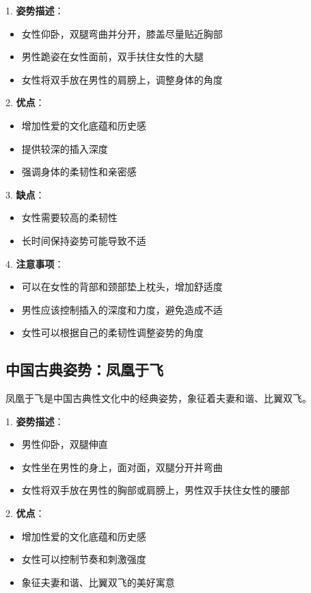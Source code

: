 \documentclass[12pt,UTF8]{ctexbook}
\begin{document}
1. \textbf{姿势描述}：
  \begin{itemize}
  \item 女性仰卧，双腿弯曲并分开，膝盖尽量贴近胸部
  \item 男性跪姿在女性面前，双手扶住女性的大腿
  \item 女性将双手放在男性的肩膀上，调整身体的角度
  \end{itemize}

2. \textbf{优点}：
  \begin{itemize}
  \item 增加性爱的文化底蕴和历史感
  \item 提供较深的插入深度
  \item 强调身体的柔韧性和亲密感
  \end{itemize}

3. \textbf{缺点}：
  \begin{itemize}
  \item 女性需要较高的柔韧性
  \item 长时间保持姿势可能导致不适
  \end{itemize}

4. \textbf{注意事项}：
  \begin{itemize}
  \item 可以在女性的背部和颈部垫上枕头，增加舒适度
  \item 男性应该控制插入的深度和力度，避免造成不适
  \item 女性可以根据自己的柔韧性调整姿势的角度
  \end{itemize}

\subsection{中国古典姿势：凤凰于飞}

凤凰于飞是中国古典性文化中的经典姿势，象征着夫妻和谐、比翼双飞。

1. \textbf{姿势描述}：
  \begin{itemize}
  \item 男性仰卧，双腿伸直
  \item 女性坐在男性的身上，面对面，双腿分开并弯曲
  \item 女性将双手放在男性的胸部或肩膀上，男性双手扶住女性的腰部
  \end{itemize}

2. \textbf{优点}：
  \begin{itemize}
  \item 增加性爱的文化底蕴和历史感
  \item 女性可以控制节奏和刺激强度
  \item 象征夫妻和谐、比翼双飞的美好寓意
  \end{itemize}
\end{document}
